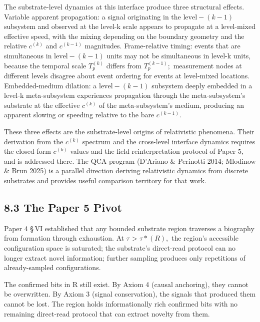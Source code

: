 \documentclass[11pt,oneside]{report}
\theoremstyle{definition}
\theoremstyle{remark}
\begin{document}
The substrate-level dynamics at this interface produce three structural
effects. Variable apparent propagation: a signal originating in the
\ensuremath{\text{level}-(k-1)} subsystem and observed at the level-k scale appears to
propagate at a level-mixed effective speed, with the mixing depending on
the boundary geometry and the relative \ensuremath{c^{(k)}} and \ensuremath{c^{(k-1)}}
magnitudes. Frame-relative timing: events that are simultaneous in
\ensuremath{\text{level}-(k-1)} units may not be simultaneous in level-k units, because the
temporal scale \ensuremath{T_{p}^{(k)}} differs from \ensuremath{T_{p}^{(k-1)};} measurement nodes
at different levels disagree about event ordering for events at
level-mixed locations. Embedded-medium dilation: a \ensuremath{\text{level}-(k-1)} subsystem
deeply embedded in a level-k meta-subsystem experiences propagation
through the meta-subsystem's substrate at the effective \ensuremath{c^{(k)}} of the
meta-subsystem's medium, producing an apparent slowing or speeding
relative to the bare \ensuremath{c^{(k-1)}.}

These three effects are the substrate-level origins of relativistic
phenomena. Their derivation from the \ensuremath{c^{(k)}} spectrum and the
cross-level interface dynamics requires the closed-form \ensuremath{c^{(k)}} values
and the field reinterpretation protocol of Paper 5, and is addressed
there. The QCA program (D'Ariano \& Perinotti 2014; Mlodinow \& Brun
2025) is a parallel direction deriving relativistic dynamics from
discrete substrates and provides useful comparison territory for that
work.

\subsection*{8.3 The Paper 5 Pivot}

Paper 4 \S\,VI established that any bounded substrate region traverses a
biography from formation through exhaustion. At \ensuremath{\tau} \textgreater{} \ensuremath{\tau *(R),}
the region's accessible configuration space is saturated; the
substrate's direct-read protocol can no longer extract novel
information; further sampling produces only repetitions of
already-sampled configurations.

The confirmed bits in R still exist. By Axiom 4 (causal anchoring), they
cannot be overwritten. By Axiom 3 (signal conservation), the signals
that produced them cannot be lost. The region holds informationally rich
confirmed bits with no remaining direct-read protocol that can extract
novelty from them.
\end{document}
